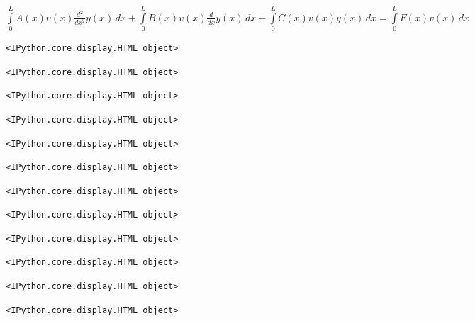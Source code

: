 \documentclass[
  11pt,
  a4paper,
]{scrbook}
\begin{document}
$\displaystyle \int\limits_{0}^{L} A{\left(x \right)} v{\left(x \right)} \frac{d^{2}}{d x^{2}} y{\left(x \right)}\, dx + \int\limits_{0}^{L} B{\left(x \right)} v{\left(x \right)} \frac{d}{d x} y{\left(x \right)}\, dx + \int\limits_{0}^{L} C{\left(x \right)} v{\left(x \right)} y{\left(x \right)}\, dx = \int\limits_{0}^{L} F{\left(x \right)} v{\left(x \right)}\, dx$

\begin{verbatim}
<IPython.core.display.HTML object>
\end{verbatim}

\begin{verbatim}
<IPython.core.display.HTML object>
\end{verbatim}

\begin{verbatim}
<IPython.core.display.HTML object>
\end{verbatim}

\begin{verbatim}
<IPython.core.display.HTML object>
\end{verbatim}

\begin{verbatim}
<IPython.core.display.HTML object>
\end{verbatim}

\begin{verbatim}
<IPython.core.display.HTML object>
\end{verbatim}

\begin{verbatim}
<IPython.core.display.HTML object>
\end{verbatim}

\begin{verbatim}
<IPython.core.display.HTML object>
\end{verbatim}

\begin{verbatim}
<IPython.core.display.HTML object>
\end{verbatim}

\begin{verbatim}
<IPython.core.display.HTML object>
\end{verbatim}

\begin{verbatim}
<IPython.core.display.HTML object>
\end{verbatim}

\begin{verbatim}
<IPython.core.display.HTML object>
\end{verbatim}
\end{document}
